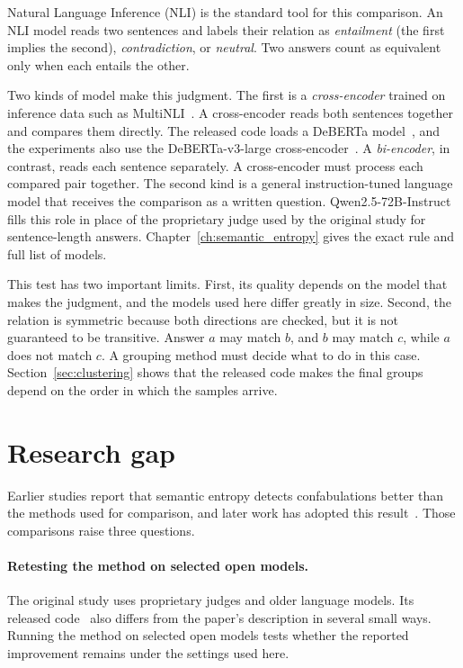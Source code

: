 Natural Language Inference (NLI) is the standard tool for this comparison. An
NLI model reads two sentences and labels their relation as \emph{entailment}
(the first implies the second), \emph{contradiction}, or \emph{neutral}. Two
answers count as equivalent only when each entails the other.

Two kinds of model make this judgment. The first is a \emph{cross-encoder}
trained on inference data such as MultiNLI~\cite{williams_multinli_2018}. A
cross-encoder reads both sentences together and compares them directly. The
released code loads a DeBERTa model~\cite{he_deberta_2021}, and the experiments
also use the DeBERTa-v3-large cross-encoder~\cite{he_debertav3_2021,%
sentence_transformers_nli_deberta_v3_large_2022}. A \emph{bi-encoder}, in contrast,
reads each sentence separately. A cross-encoder must process each compared pair
together. The second kind is a general instruction-tuned language model that
receives the comparison as a written question.
Qwen2.5-72B-Instruct~\cite{yang_qwen25_2024} fills this role
in place of the proprietary judge used by the original study for
sentence-length answers. Chapter~\ref{ch:semantic_entropy} gives the exact rule
and full list of models.

This test has two important limits. First, its quality depends on the model that
makes the judgment, and the models used here differ greatly in size. Second,
the relation is symmetric because both directions are checked, but it is not
guaranteed to be transitive. Answer $a$ may match $b$, and $b$ may match $c$,
while $a$ does not match $c$. A grouping method must decide what to do in this
case. Section~\ref{sec:clustering} shows that the released code makes the final
groups depend on the order in which the samples arrive.

\section{Research gap}
\label{sec:research-gap}

Earlier studies report that semantic entropy detects confabulations better than
the methods used for comparison, and later work has adopted this
result~\cite{semantic_entropy_nature_2024,kuhn_semantic_uncertainty_2023,%
kossen_semantic_entropy_probes_2024}. Those comparisons raise three questions.

\paragraph{Retesting the method on selected open models.} The
original study uses proprietary judges and older language models. Its released
code~\cite{kossen_semantic_uncertainty_code_2024} also differs from the paper's
description in several small ways. Running the method on selected open models
tests whether the reported improvement remains under the settings used here.

